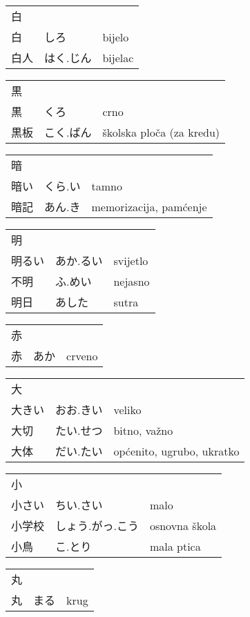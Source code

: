 

\newenvironment{dictentry}[1]{
	\begin{tabular}{p{2cm} p{3cm} p{10cm}}
		#1 &&\\
}{
	\end{tabular}
	\vspace{20pt}
}

\newcommand{\example}[3]{
	\hspace*{\fill}#1 & #2 & #3\\
}

\author{ロボット君}


\begin{dictentry}{白}
\example{白}{しろ}{bijelo}
\example{白人}{はく.じん}{bijelac}
\end{dictentry}

\begin{dictentry}{黒}
\example{黒}{くろ}{crno}
\example{黒板}{こく.ばん}{školska ploča (za kredu)}
\end{dictentry}

\begin{dictentry}{暗}
\example{暗い}{くら.い}{tamno}
\example{暗記}{あん.き}{memorizacija, pamćenje}
\end{dictentry}

\begin{dictentry}{明}
\example{明るい}{あか.るい}{svijetlo}
\example{不明}{ふ.めい}{nejasno}
\example{明日}{あした\footnotemark[1]}{sutra}
\end{dictentry}

\begin{dictentry}{赤}
\example{赤}{あか}{crveno}
\end{dictentry}

\begin{dictentry}{大}
\example{大きい}{おお.きい}{veliko}
\example{大切}{たい.せつ}{bitno, važno}
\example{大体}{だい.たい}{općenito, ugrubo, ukratko}
\end{dictentry}

\begin{dictentry}{小}
\example{小さい}{ちい.さい}{malo}
\example{小学校}{しょう.がっ.こう}{osnovna škola}
\example{小鳥}{こ.とり}{mala ptica}
\end{dictentry}

\begin{dictentry}{丸}
\example{丸}{まる}{krug}
\end{dictentry}

